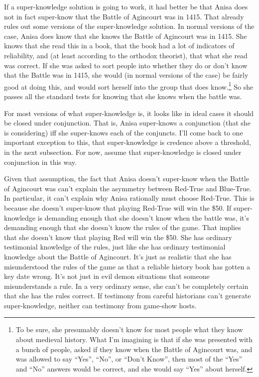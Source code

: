 \documentclass[
  10pt,
  letterpaper,
  twoside]{scrbook}
\begin{document}
If a super-knowledge solution is going to work, it had better be that
Anisa does not in fact super-know that the Battle of Agincourt was in
1415. That already rules out some versions of the super-knowledge
solution. In normal versions of the case, Anisa does know that she knows
the Battle of Agincourt was in 1415. She knows that she read this in a
book, that the book had a lot of indicators of reliability, and (at
least according to the orthodox theorist), that what she read was
correct. If she was asked to sort people into whether they do or don't
know that the Battle was in 1415, she would (in normal versions of the
case) be fairly good at doing this, and would sort herself into the
group that does know.\footnote{To be sure, she presumably doesn't know
  for most people what they know about medieval history. What I'm
  imagining is that if she was presented with a bunch of people, asked
  if they know when the Battle of Agincourt was, and was allowed to say
  ``Yes'', ``No'', or ``Don't Know'', then most of the ``Yes'' and
  ``No'' answers would be correct, and she would say ``Yes'' about
  herself.} So she passes all the standard tests for knowing that she
knows when the battle was.

For most versions of what super-knowledge is, it looks like in ideal
cases it should be closed under conjunction. That is, Anisa super-knows
a conjunction (that she is considering) iff she super-knows each of the
conjuncts. I'll come back to one important exception to this, that
super-knowledge is credence above a threshold, in the next subsection.
For now, assume that super-knowledge is closed under conjunction in this
way.

Given that assumption, the fact that Anisa doesn't super-know when the
Battle of Agincourt was can't explain the asymmetry between Red-True and
Blue-True. In particular, it can't explain why Anisa rationally must
choose Red-True. This is because she doesn't super-know that playing
Red-True will win the \$50. If super-knowledge is demanding enough that
she doesn't know when the battle was, it's demanding enough that she
doesn't know the rules of the game. That implies that she doesn't know
that playing Red will win the \$50. She has ordinary testimonial
knowledge of the rules, just like she has ordinary testimonial knowledge
about the Battle of Agincourt. It's just as realistic that she has
misunderstood the rules of the game as that a reliable history book has
gotten a key date wrong. It's not just in evil demon situations that
someone misunderstands a rule. In a very ordinary sense, she can't be
completely certain that she has the rules correct. If testimony from
careful historians can't generate super-knowledge, neither can testimony
from game-show hosts.
\end{document}

